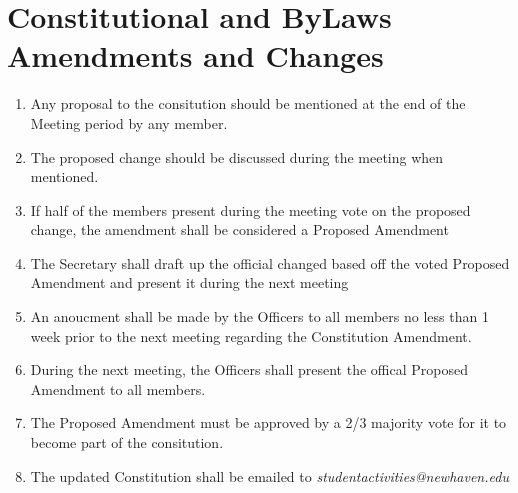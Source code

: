 \documentclass[a4paper,12pt]{article}
\begin{document}
\section{Constitutional and ByLaws Amendments and Changes}
\begin{enumerate}[label=\thesection.\arabic*.]
  \item Any proposal to the consitution should be mentioned at the end of the Meeting period by any member.
  \item The proposed change should be discussed during the meeting when mentioned.
  \item If half of the members present during the meeting vote on the proposed change, the amendment shall be considered a Proposed Amendment
  \item The Secretary shall draft up the official changed based off the voted Proposed Amendment and present it during the next meeting
  \item An anoucment shall be made by the Officers to all members no less than 1 week prior to the next meeting regarding the Constitution Amendment.
  \item During the next meeting, the Officers shall present the offical Proposed Amendment to all members.
  \item The Proposed Amendment must be approved by a 2/3 majority vote for it to become part of the consitution.
  \item The updated Constitution shall be emailed to \textit{studentactivities@newhaven.edu}
\end{enumerate}
\end{document}
